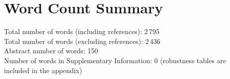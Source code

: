\documentclass[12pt]{article}
\begin{document}
\appendix


\FloatBarrier

\section*{Word Count Summary}
Total number of words (including references): 2\,795\\
Total number of words (excluding references): 2\,436\\
Abstract number of words: 150\\
Number of words in Supplementary Information: 0 (robustness tables are included in the appendix)



\end{document}
